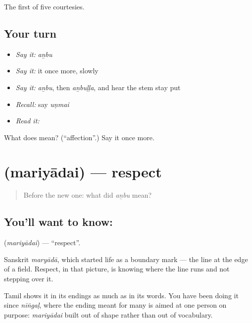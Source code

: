 \begin{grammarlens}[title={What you've built}]
The first of five courtesies.
\end{grammarlens}

\subsection*{Your turn}
\begin{itemize}
\raggedright
  \item \emph{Say it:} \emph{aṉbu}
  \item \emph{Say it:} it once more, slowly
  \item \emph{Say it:} \emph{aṉbu}, then \emph{aṉbuḷḷa}, and hear the stem stay put
  \item \emph{Recall:} say \emph{uṇmai}
  \item \emph{Read it:} \textbf{}
\end{itemize}

\begin{tcolorbox}[breakable,colback=teal!4,colframe=teal!35!black,title={Before you move on}]
What does  mean? (\textquotedblleft{}affection\textquotedblright{}.) Say it once more.
\end{tcolorbox}
\section[\texorpdfstring{\ta{மரியாதை} (mariyādai)}{மரியாதை (mariyādai)}]{ (mariyādai) — respect}

\label{lesson:TA-C49-respect}



\begin{quote}
Before the new one: what did \emph{aṉbu} mean?
\end{quote}

\subsection*{You'll want to know: }
\textbf{} (\emph{mariyādai}) — \textquotedblleft{}respect\textquotedblright{}.

Sanskrit \emph{maryādā}, which started life as a boundary mark — the line at the edge of a field. Respect, in that picture, is knowing where the line runs and not stepping over it.

Tamil shows it in its endings as much as in its words. You have been doing it since \emph{nīṅgaḷ}, where the ending meant for many is aimed at one person on purpose: \emph{mariyādai} built out of shape rather than out of vocabulary.

